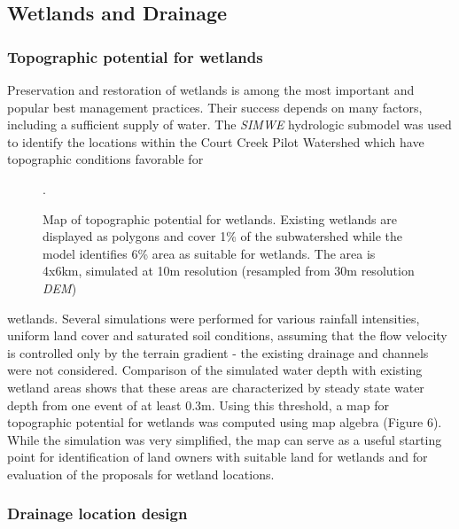 \documentclass{kapedbk} %
\begin{document}
\bigskip \medskip \noindent
\subsection{Wetlands and Drainage}

\medskip
\noindent
\subsubsection {Topographic potential for wetlands}

\quad

\medskip
Preservation and restoration of wetlands is among the most
important and popular best management practices. Their success
depends on many factors, including
a sufficient supply of water.
The {\sl SIMWE} hydrologic submodel was used to identify
the locations  within the Court Creek Pilot Watershed which have
topographic conditions favorable for 
\begin{figure}[h]
\centerline{}
\caption{ Map of topographic potential for wetlands.
Existing wetlands are displayed as polygons and cover 1\% of the subwatershed
while the model identifies 6\% area as suitable for
wetlands. The area is 4x6km, simulated at 10m
resolution (resampled from 30m resolution {\sl DEM})}.
\end{figure}

\noindent
wetlands.
Several simulations were performed for various rainfall intensities,
uniform land cover and saturated soil conditions, assuming that the flow
velocity is controlled only by the terrain gradient - the existing drainage
and channels were not considered.
Comparison of the simulated water depth with existing
wetland areas shows that these areas are characterized by 
steady state water depth from one event of
at least 0.3m. Using this threshold,
a map for topographic potential for wetlands was
computed using map algebra (Figure 6). While the simulation was very simplified,
the map can serve as a useful starting point for
identification of land owners with suitable land for wetlands
and for evaluation of the proposals for wetland locations.


\medskip\noindent
\subsubsection{Drainage location design}

\quad
\end{document}
